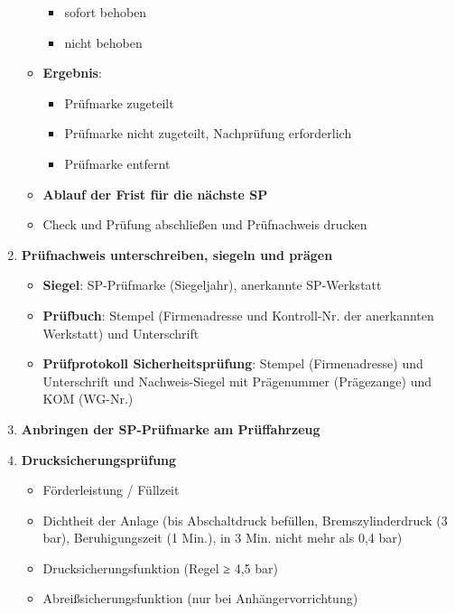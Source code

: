 \documentclass{vorlage-design-main}
\begin{document}
\begin{enumerate}
\begin{itemize}
    \begin{itemize}
    
    \item
      sofort behoben
    \item
      nicht behoben
    \end{itemize}
  \item
    \textbf{Ergebnis}:

    \begin{itemize}
    
    \item
      Prüfmarke zugeteilt
    \item
      Prüfmarke nicht zugeteilt, Nachprüfung erforderlich
    \item
      Prüfmarke entfernt
    \end{itemize}
  \item
    \textbf{Ablauf der Frist für die nächste SP}
  \item
    Check und Prüfung abschließen und Prüfnachweis drucken
  \end{itemize}
\item
  \textbf{Prüfnachweis unterschreiben, siegeln und prägen}

  \begin{itemize}
  
  \item
    \textbf{Siegel}: SP-Prüfmarke (Siegeljahr), anerkannte SP-Werkstatt
  \item
    \textbf{Prüfbuch}: Stempel (Firmenadresse und Kontroll-Nr. der
    anerkannten Werkstatt) und Unterschrift
  \item
    \textbf{Prüfprotokoll Sicherheitsprüfung}: Stempel (Firmenadresse)
    und Unterschrift und Nachweis-Siegel mit Prägenummer (Prägezange)
    und KOM (WG-Nr.)
  \end{itemize}
\item
  \textbf{Anbringen der SP-Prüfmarke am Prüffahrzeug}
\item
  \textbf{Drucksicherungsprüfung}

  \begin{itemize}
  
  \item
    Förderleistung / Füllzeit
  \item
    Dichtheit der Anlage (bis Abschaltdruck befüllen, Bremszylinderdruck
    (3 bar), Beruhigungszeit (1 Min.), in 3 Min. nicht mehr als 0,4 bar)
  \item
    Drucksicherungsfunktion (Regel ≥ 4,5 bar)
  \item
    Abreißsicherungsfunktion (nur bei Anhängervorrichtung)


\end{itemize}
\end{enumerate}
\end{document}
